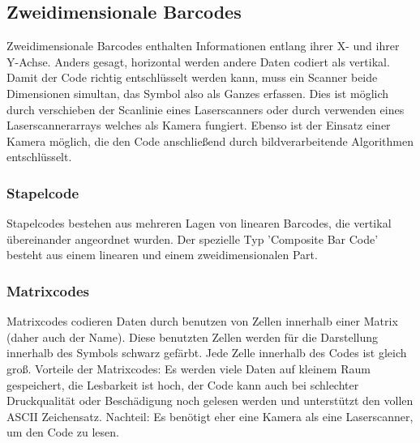 \subsection{Zweidimensionale Barcodes}
Zweidimensionale Barcodes enthalten Informationen entlang ihrer X- und ihrer Y-Achse. Anders gesagt, horizontal werden andere Daten codiert als vertikal.
Damit der Code richtig entschlüsselt werden kann, muss ein Scanner beide Dimensionen simultan, das Symbol also als Ganzes erfassen. Dies ist möglich durch verschieben der Scanlinie eines Laserscanners oder durch verwenden eines Laserscannerarrays welches als Kamera fungiert. Ebenso ist der Einsatz einer Kamera möglich, die den Code anschließend durch bildverarbeitende Algorithmen entschlüsselt.

\subsubsection{Stapelcode}
Stapelcodes bestehen aus mehreren Lagen von linearen Barcodes, die vertikal übereinander angeordnet wurden.
Der spezielle Typ 'Composite Bar Code' besteht aus einem linearen und einem zweidimensionalen Part.

\subsubsection{Matrixcodes}
Matrixcodes codieren Daten durch benutzen von Zellen innerhalb einer Matrix (daher auch der Name). Diese benutzten Zellen werden für die Darstellung innerhalb des Symbols schwarz gefärbt. Jede Zelle innerhalb des Codes ist gleich groß. 
Vorteile der Matrixcodes: Es werden viele Daten auf kleinem Raum gespeichert, die Lesbarkeit ist hoch, der Code kann auch bei schlechter Druckqualität oder Beschädigung noch gelesen werden und unterstützt den vollen ASCII Zeichensatz.
Nachteil: Es benötigt eher eine Kamera als eine Laserscanner, um den Code zu lesen. 
\samepage
